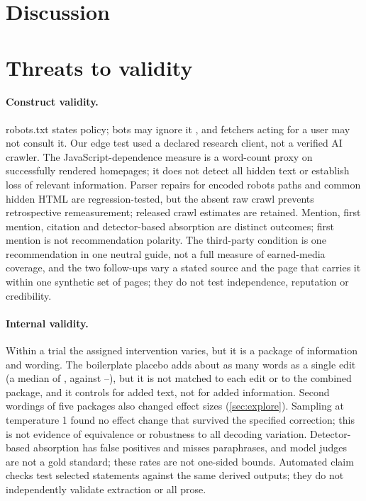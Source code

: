 \documentclass[11pt]{article}
\begin{document}





\section{Discussion}
\label{sec:synthesis}



\section{Threats to validity}
\label{sec:validity}

\paragraph{Construct validity.} robots.txt states policy; bots may ignore it \citep{kim2025scrapers}, and fetchers
acting for a user may not consult it. Our edge test used a declared research client, not a verified AI crawler. The
JavaScript-dependence measure is a word-count proxy on successfully rendered homepages; it does not detect all hidden
text or establish loss of relevant information. Parser repairs for encoded robots paths and common hidden HTML are regression-tested, but the absent raw crawl prevents retrospective remeasurement; released crawl estimates are retained. Mention, first mention, citation and detector-based absorption are
distinct outcomes; first mention is not recommendation polarity. The third-party condition is one recommendation in one
neutral guide, not a full measure of earned-media coverage, and the two follow-ups vary a stated source and the page
that carries it within one synthetic set of pages; they do not test independence, reputation or credibility.

\paragraph{Internal validity.} Within a trial the assigned intervention varies, but it is a package of information and
wording. The boilerplate placebo adds about as many words as a single edit (a median of \RevPlaceboWords, against
\RevSingleWordsMin--\RevSingleWordsMax), but it is not matched to each edit or to the combined package, and it controls
for added text, not for added information. Second wordings of five packages
also changed effect sizes (\cref{sec:explore}). Sampling at temperature 1 found no effect change that survived the
specified correction; this is not evidence of equivalence or robustness to all decoding variation. Detector-based
absorption has false positives and misses paraphrases, and model judges are not a gold standard; these rates are not
one-sided bounds. Automated claim checks test selected statements against the same derived outputs; they do not independently validate extraction or all prose.
\end{document}

